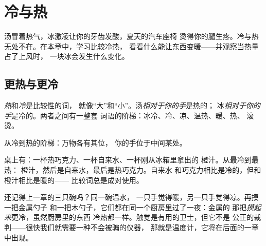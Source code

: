 \chapter{冷与热}\label{ch:g1:hot-and-cold}

汤冒着热气，冰激凌让你的牙齿发酸，夏天的汽车座椅
烫得你的腿生疼。冷与热无处不在。在本章中，学习比较冷热，
看看什么能让东西变暖——并观察当热量占了上风时，
一块冰会发生什么变化。

\section{更热与更冷}

\begin{definition}[冷与热]\label{def:g1:hot-and-cold:words}
\emph{热}和\emph{冷}是比较性的词，
就像“大”和“小”。汤\emph{相对于你的手}是热的；
冰\emph{相对于你的手}是冷的。两者之间有一整套
词语的阶梯：冰冷、冷、凉、温热、暖、热、
滚烫。
\end{definition}

\begin{omfigure}

{\small 从冷到热的阶梯：万物各有其位，
你的手位于中间某处。}
\end{omfigure}

\begin{example}[给三杯饮料排序]\label{ex:g1:hot-and-cold:drinks}
桌上有：一杯热巧克力、一杯自来水、一杯刚从冰箱里拿出的
橙汁。从最冷到最热：
橙汁，然后是自来水，最后是热巧克力。自来水
和巧克力相比是冷的，但和橙汁相比是暖的——
比较词总是成对使用。
\end{example}

\begin{remark}[触觉会被骗]\label{rem:g1:hot-and-cold:fooled}
还记得上一章的三只碗吗？同一碗温水，
一只手觉得暖，另一只手觉得凉。再摸一把金属勺子
和一把木勺子，它们都在同一个厨房里过了一夜：金属的
那把\emph{摸起来}更冷，虽然厨房里的东西
冷热都一样。触觉是有用的卫士，但它不是
公正的裁判——很快我们就需要一种不会被骗的仪器，
那就是温度计，它将在后面的一章中出现。
\end{remark}

